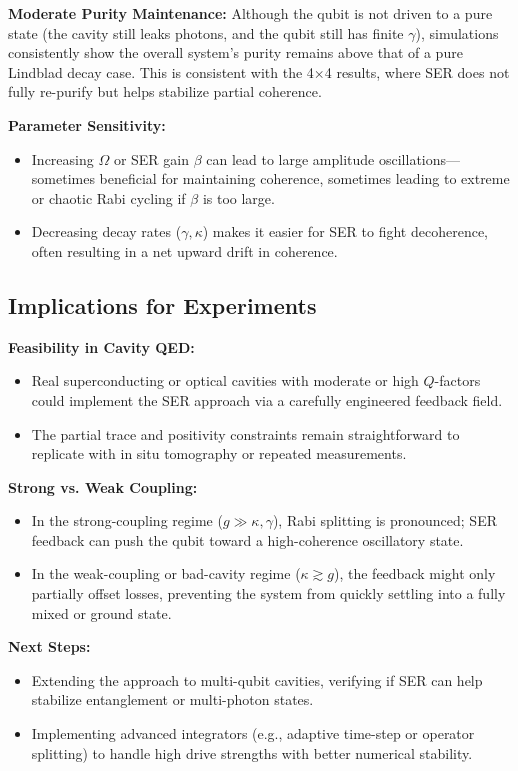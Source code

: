\documentclass[12pt]{article}
\begin{document}
\textbf{Moderate Purity Maintenance:}
Although the qubit is not driven to a pure state (the cavity still leaks photons, and the qubit still has finite $\gamma$), simulations consistently show the overall system’s purity remains above that of a pure Lindblad decay case. This is consistent with the 4$\times$4 results, where SER does not fully re-purify but helps stabilize partial coherence.

\textbf{Parameter Sensitivity:}
\begin{itemize}
    \item Increasing $\Omega$ or SER gain $\beta$ can lead to large amplitude oscillations—sometimes beneficial for maintaining coherence, sometimes leading to extreme or chaotic Rabi cycling if $\beta$ is too large.
    \item Decreasing decay rates ($\gamma, \kappa$) makes it easier for SER to fight decoherence, often resulting in a net upward drift in coherence.
\end{itemize}

\subsection{Implications for Experiments}
\textbf{Feasibility in Cavity QED:}
\begin{itemize}
    \item Real superconducting or optical cavities with moderate or high $Q$-factors could implement the SER approach via a carefully engineered feedback field.
    \item The partial trace and positivity constraints remain straightforward to replicate with in situ tomography or repeated measurements.
\end{itemize}

\textbf{Strong vs. Weak Coupling:}
\begin{itemize}
    \item In the strong-coupling regime ($g \gg \kappa, \gamma$), Rabi splitting is pronounced; SER feedback can push the qubit toward a high-coherence oscillatory state.
    \item In the weak-coupling or bad-cavity regime ($\kappa \gtrsim g$), the feedback might only partially offset losses, preventing the system from quickly settling into a fully mixed or ground state.
\end{itemize}

\textbf{Next Steps:}
\begin{itemize}
    \item Extending the approach to multi-qubit cavities, verifying if SER can help stabilize entanglement or multi-photon states.
    \item Implementing advanced integrators (e.g., adaptive time-step or operator splitting) to handle high drive strengths with better numerical stability.
\end{itemize}
\end{document}
